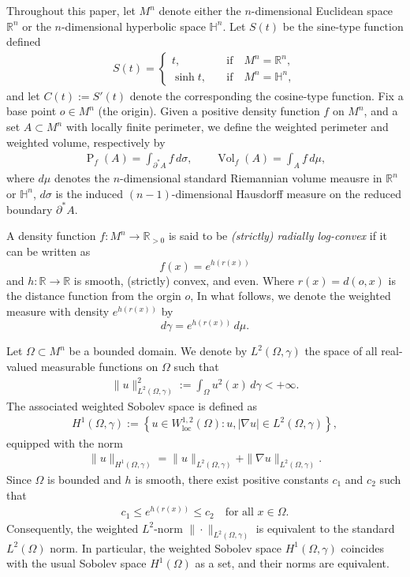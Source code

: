 \documentclass[11pt,leqno]{amsart}
\def\R{\mathbb{R}}
\numberwithin{equation}{section}
\begin{document}
Throughout this paper, let $M^n$ denote either the $n$-dimensional Euclidean space $\mathbb{R}^n$ or the $n$-dimensional hyperbolic space $\mathbb{H}^n$. Let $S(t)$ be the sine-type function defined
\begin{align*}
    S(t)=\begin{cases}
    t, &\quad \text{if} \quad M^n= \R^n,\\
     \sinh t, &\quad \text{if} \quad M^n=\mathbb{H}^n,
    \end{cases}
\end{align*}
and let  $C(t):=S'(t)$ denote the corresponding the cosine-type function.
Fix a  base point $o \in M^n$ (the origin). Given a positive density function $f$ on $M^n$, and a   set $A \subset M^n$ with locally finite perimeter, we define the weighted perimeter and weighted volume, respectively by
\begin{align*}
\operatorname{P}_{f}(A) = \int_{\partial^* A} f \, d\sigma, \qquad
\operatorname{Vol}_{f}(A) = \int_{A} f \, d\mu,
\end{align*}
where $d\mu$ denotes the $n$-dimensional standard Riemannian volume meausre in $\R^n$ or $\mathbb{H}^n$, $d\sigma$ is the induced $(n-1)$-dimensional Hausdorff measure on the reduced boundary  $\partial^* A$.

A density function $f \colon M^n \to \mathbb{R}_{>0}$ is said to be \emph{(strictly) radially log-convex} if  it can be written as $$f(x)=e^{h(r(x))}$$ and
 $h \colon \mathbb{R} \to \mathbb{R}$ is  smooth, (strictly) convex, and even.
Where $r(x) = d(o,x)$ is the  distance function from the orgin $o$,  In  what follows, we denote the weighted measure  with density  $e^{h(r(x))} $ by $$d\gamma = e^{h(r(x))} \, d\mu.$$

Let $\Omega \subset M^n$ be a bounded domain. We  denote by $L^2(\Omega, \gamma)$ the space of all real-valued measurable functions on $\Omega$ such that
\begin{align*}
\|u\|_{L^2(\Omega, \gamma)}^2 := \int_{\Omega} u^2(x) \, d\gamma< +\infty.
\end{align*}
The associated weighted Sobolev space is defined as
\begin{align*}
H^1(\Omega, \gamma) := \left\{ u \in W^{1,2}_{\mathrm{loc}}(\Omega) : u, |\nabla u| \in L^2(\Omega, \gamma) \right\},
\end{align*}
 equipped with the norm
\begin{align*}
\|u\|_{H^1(\Omega, \gamma)} = \|u\|_{L^2(\Omega, \gamma)} + \|\nabla u\|_{L^2(\Omega, \gamma)}.
\end{align*}
Since $\Omega$ is bounded and $h$ is smooth,  there exist positive constants $c_1$ and $c_2$ such that
\begin{align*}
c_1 \le e^{h(r(x))} \le c_2 \quad \text{for all } x \in \Omega.
\end{align*}
Consequently, the weighted $L^2$-norm $\|\cdot\|_{L^2(\Omega,\gamma)}$ is equivalent to the standard $L^2(\Omega)$ norm. In particular, the weighted Sobolev space 
 $H^1(\Omega, \gamma)$ coincides with the usual Sobolev space $H^1(\Omega)$ as a set, and their norms are equivalent.
\end{document}
